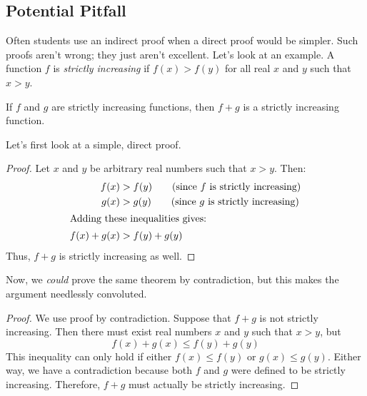 \begin{editingnotes}

\subsection{Potential Pitfall}

Often students use an indirect proof when a direct proof would be
simpler.  Such proofs aren't wrong; they just aren't excellent.  Let's
look at an example.  A function $f$ is \textit{strictly increasing} if
$f(x) > f(y)$ for all real $x$ and $y$ such that $x > y$.

\begin{theorem}
If $f$ and $g$ are strictly increasing functions, then $f + g$ is a
strictly increasing function.
\end{theorem}

Let's first look at a simple, direct proof.

\begin{proof}
Let $x$ and $y$ be arbitrary real numbers such that $x > y$.  Then:
\begin{align*}
f(x) & > f(y) \qquad \text{(since $f$ is strictly increasing)} \\
g(x) & > g(y) \qquad \text{(since $g$ is strictly increasing)} \\
\intertext{Adding these inequalities gives:}
f(x) + g(x) & > f(y) + g(y)
\end{align*}
Thus, $f + g$ is strictly increasing as well.
\end{proof}

Now, we \textit{could} prove the same theorem by contradiction, but
this makes the argument needlessly convoluted.

\begin{proof}
We use proof by contradiction.  Suppose that $f + g$ is not strictly
increasing.  Then there must exist real numbers $x$ and $y$ such that
$x > y$, but
%
\[
f(x) + g(x) \leq f(y) + g(y)
\]
%
This inequality can only hold if either $f(x) \leq f(y)$ or $g(x) \leq
g(y)$.  Either way, we have a contradiction because both $f$ and $g$
were defined to be strictly increasing.  Therefore, $f + g$ must
actually be strictly increasing.
\end{proof}

\end{editingnotes}

\begin{problems}
\classproblems
{}

\homeworkproblems
{}

\examproblems
{}
\end{problems}

